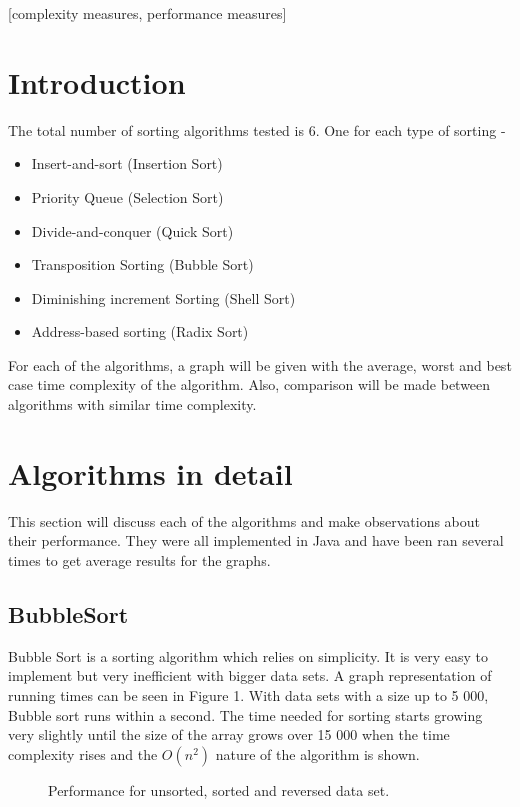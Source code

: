 \documentclass{acm_proc_article-sp}
\begin{document}
[complexity measures, performance measures]



\section{Introduction}
The total number of sorting algorithms tested is 6. One for each type of
sorting -\\
\begin{itemize}
\item Insert-and-sort (Insertion Sort)
\item Priority Queue (Selection Sort)
\item Divide-and-conquer (Quick Sort)
\item Transposition Sorting (Bubble Sort)
\item Diminishing increment Sorting (Shell Sort)
\item Address-based sorting (Radix Sort)
\end{itemize}
For each of the algorithms, a graph will be given with the average, worst and best case
time complexity of the algorithm. Also, comparison will be made between algorithms with similar time complexity.

\section{Algorithms in detail}
This section will discuss each of the algorithms and make observations
about their performance. They were all implemented in Java and have been ran several times to get average results for the graphs.
\subsection{BubbleSort}
Bubble Sort is a sorting algorithm which relies on simplicity. 
It is very easy to implement but very inefficient with bigger data sets. A graph representation of running times can be seen in Figure 1. With data sets with a size up to 5 000, Bubble sort runs within a second. The time needed for sorting starts growing very slightly until the size of the array grows over 15 000 when the time complexity rises and the $O(n^{2})$ nature of the algorithm is shown.
\begin{figure}[!htb]
\caption{Performance for unsorted, sorted and reversed data set.}
\end{figure}
\end{document}
